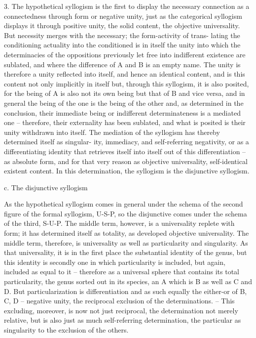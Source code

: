 3. The hypothetical syllogism is the first to display the necessary connection
as a connectedness through form or negative unity, just as the categorical
syllogism displays it through positive unity, the solid content, the objective
universality. But necessity merges with the necessary; the form-activity of trans-
lating the conditioning actuality into the conditioned is in itself the unity
into which the determinacies of the oppositions previously let free into
indifferent existence are sublated, and where the difference of A and B is an
empty name. The unity is therefore a unity reflected into itself, and hence an
identical content, and is this content not only implicitly in itself but, through
this syllogism, it is also posited, for the being of A is also not its own being
but that of B and vice versa, and in general the being of the one is the being
of the other and, as determined in the conclusion, their immediate being or
indifferent determinateness is a mediated one – therefore, their externality
has been sublated, and what is posited is their unity withdrawn into itself.
The mediation of the syllogism has thereby determined itself as singular-
ity, immediacy, and self-referring negativity, or as a differentiating identity
that retrieves itself into itself out of this differentiation – as absolute form,
and for that very reason as objective universality, self-identical existent
content. In this determination, the syllogism is the disjunctive syllogism.

c. The disjunctive syllogism

As the hypothetical syllogism comes in general under the schema of the
second figure of the formal syllogism, U-S-P, so the disjunctive comes
under the schema of the third, S-U-P. The middle term, however, is a
universality replete with form; it has determined itself as totality, as developed
objective universality. The middle term, therefore, is universality as well as
particularity and singularity. As that universality, it is in the first place the
substantial identity of the genus, but this identity is secondly one in which
particularity is included, but again, included as equal to it – therefore as a
universal sphere that contains its total particularity, the genus sorted out
in its species, an A which is B as well as C and D. But particularization is
differentiation and as such equally the either-or of B, C, D – negative unity,
the reciprocal exclusion of the determinations. – This excluding, moreover,
is now not just reciprocal, the determination not merely relative, but is also
just as much self-referring determination, the particular as singularity to the
exclusion of the others.

